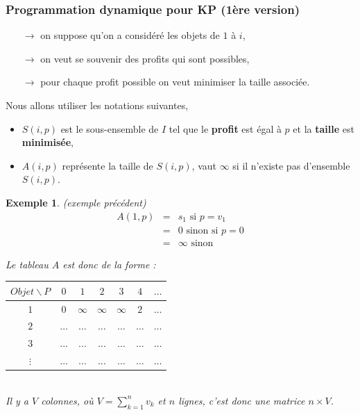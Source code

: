 \documentclass[12pt]{article}
\newcommand{\titre}[1]{\textcolor{title}{#1}}
\newtheorem{exemple}{Exemple}[section]
\begin{document}
\subsubsection{Programmation dynamique pour \titre{KP} (1ère version)}
\begin{itemize}
\item[$\rightarrow$] on suppose qu'on a considéré les objets de $1$ à $i$,
\item[$\rightarrow$] on veut se souvenir des profits qui sont possibles,
\item[$\rightarrow$] pour chaque profit possible on veut minimiser la taille associée.
\end{itemize}

Nous allons utiliser les notations suivantes,
\begin{itemize}
\item $S(i,p)$ est le sous-ensemble de $I$ tel que le \textbf{profit} est égal à $p$ et la \textbf{taille} est \textbf{minimisée},
\item $A(i,p)$ représente la taille de $S(i,p)$, vaut $\infty$ si il n'existe pas d'ensemble $S(i,p)$.
\end{itemize}

\begin{exemple} \textit{(exemple précédent)}
\begin{eqnarray}
\nonumber A(1,p) & = & s_1 \text{ si }p=v_1 \\
\nonumber 	     & = & 0 \text{ sinon si } p = 0 \\
\nonumber 		 & = & \infty \text{ sinon}
\end{eqnarray}



Le tableau $A$ est donc de la forme :
\begin{center}\begin{tabular}{c|cccccc}
$Objet\backslash P$ & $0$ & $1$ & $2$ & $3$ & $4$ & $\ldots$ \\
\hline
$1$ & $0$ & $\infty$ & $\infty$ & $\infty$ & $2$ & $\ldots$ \\
$2$ & $\ldots$ & $\ldots$ & $\ldots$ & $\ldots$ & $\ldots$ & $\ldots$ \\
$3$ & $\ldots$ & $\ldots$ & $\ldots$ & $\ldots$ & $\ldots$ & $\ldots$ \\
$\vdots$ & $\ldots$ & $\ldots$ & $\ldots$ & $\ldots$ & $\ldots$ & $\ldots$ \\
\end{tabular}\end{center}$ $\\
Il y a $V$ colonnes, où $V = \sum_{k=1}^n v_k$ et $n$ lignes, c'est donc une matrice $n\times V$.
\end{exemple}
\end{document}
